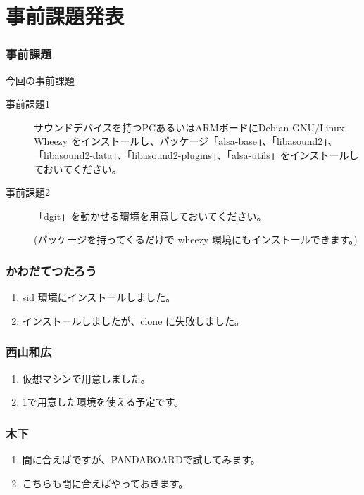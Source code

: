 \documentclass[cjk,dvipdfmx,10pt,compress,%
hyperref={bookmarks=true,bookmarksnumbered=true,bookmarksopen=false,%
colorlinks=false,%
pdftitle={第 76 回 関西 Debian 勉強会},%
pdfauthor={倉敷・のがた・佐々木・かわだ・八津尾},%
pdfsubject={資料},%
}]{beamer}
\begin{document}

\section{事前課題発表}


\begin{frame}[fragile]
  \frametitle{事前課題}
  \begin{block}{今回の事前課題}
    \begin{description}
    \item[事前課題1]
      サウンドデバイスを持つPCあるいはARMボードにDebian GNU/Linux Wheezy をインストールし、パッケージ「alsa-base」、「libasound2」、
      \sout{「libasound2-data」、}「libasound2-plugins」、「alsa-utils」をインストールしておいてください。

    \item[事前課題2]
      「dgit」を動かせる環境を用意しておいてください。

     (パッケージを持ってくるだけで wheezy 環境にもインストールできます。)
    \end{description}
  \end{block}
\end{frame}


\begin{frame}
  \frametitle{ かわだてつたろう }
  \begin{enumerate}
  \item  sid 環境にインストールしました。
  \item インストールしましたが、clone に失敗しました。
  \end{enumerate}
\end{frame}

\begin{frame}
  \frametitle{ 西山和広 }
  \begin{enumerate}
  \item 仮想マシンで用意しました。
  \item 1で用意した環境を使える予定です。
  \end{enumerate}
\end{frame}

\begin{frame}
  \frametitle{ 木下 }
  \begin{enumerate}
  \item 間に合えばですが、PANDABOARDで試してみます。
  \item こちらも間に合えばやっておきます。
  \end{enumerate}
\end{frame}
\end{document}
